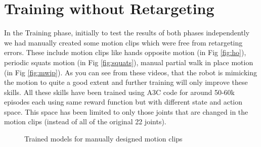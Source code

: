 \section{Training without Retargeting}
In the Training phase, initially to test the results of both phases independently we had manually created some motion clips which were free from retargeting errors. These include motion clips like hands opposite motion (in Fig \ref{fig:ho}), periodic squats motion (in Fig \ref{fig:squats}), manual partial walk in place motion (in Fig \ref{fig:mwip}). As you can see from these videos, that the robot is mimicking the motion to quite a good extent and further training will only improve these skills. All these skills have been trained using A3C code for around 50-60k episodes each using same reward function but with different state and action space. This space has been limited to only those joints that are changed in the motion clips (instead of all of the original 22 joints). 

\begin{figure}[!ht]
    \centering
    \qquad
    \qquad
    \label{fig:x1}
    \caption{Trained models for manually designed motion clips}
\end{figure}

